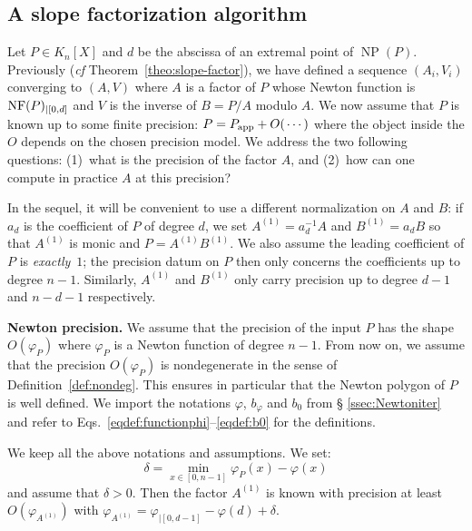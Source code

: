 \documentclass{sig-alternate-05-2015}
\DeclareMathOperator{\NP}{NP}
\newcommand{\NF}{\text{\rm NF}}
\newcommand{\app}{\textrm{app}}
\begin{document}
\subsection{A slope factorization algorithm}

Let $P \in K_n[X]$ and $d$ be the abscissa of an extremal point of 
$\NP(P)$. Previously (\emph{cf} Theorem~\ref{theo:slope-factor}), we 
have defined a sequence $(A_i, V_i)$ converging to $(A,V)$ where $A$ is 
a factor of $P$ whose Newton function is $\NF(P)_{|[0,d]}$ and $V$ is the inverse of $B = P/A$ modulo $A$.
We now assume that $P$ is known up to some finite precision: $P = P_\app + 
O(\hspace{0.5mm}\cdots)$ where the object inside the $O$ depends on the 
chosen precision model. We address the two following questions:
(1)~what is the precision of the factor $A$, and
(2)~how can one compute in practice $A$ at this precision?

In the sequel, it will be convenient to use a different normalization on 
$A$ and $B$: if $a_d$ is the coefficient of $P$ of degree $d$, we set
$A^{(1)} = a_d^{-1} A$ and $B^{(1)} = a_d B$
so that $A^{(1)}$ is monic and $P = A^{(1)} B^{(1)}$. We also assume
the leading coefficient of $P$ is \emph{exactly}~$1$; the precision datum on $P$ then 
only concerns the coefficients up to degree $n{-}1$. Similarly,
$A^{(1)}$ and $B^{(1)}$ only carry
precision up to degree $d{-}1$ and $n{-}d{-}1$ respectively.

\medskip

\noindent
{\bf Newton precision.}
We assume that the precision of the input $P$ has the shape 
$O(\varphi_P)$ where $\varphi_P$ is a Newton function of degree 
$n{-}1$. From now on, we assume that the precision $O(\varphi_P)$ 
is nondegenerate in the sense of Definition~\ref{def:nondeg}. This
ensures in particular that the Newton polygon of $P$ is well defined. 
We import the notations $\varphi$, $b_\varphi$ and $b_0$ from \S 
\ref{ssec:Newtoniter} and refer to 
Eqs.~\eqref{eqdef:functionphi}--\eqref{eqdef:b0} for the definitions.

\begin{prop}
\label{prop:Newtonprecslope}
We keep all the above notations and assumptions. We set:
$$\delta = \min_{x \in [0,n{-}1]} \varphi_P(x) - \varphi(x)$$
and assume that $\delta > 0$. 
Then the factor $A^{(1)}$ is known with precision at least 
$O(\varphi_{A^{(1)}})$ with
$\varphi_{A^{(1)}} = \varphi_{|[0,d{-}1]} - \varphi(d) + \delta$.
\end{prop}
\end{document}
